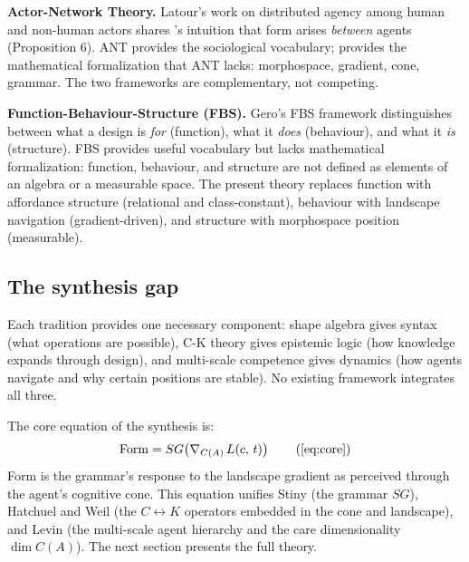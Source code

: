 \textbf{Actor-Network Theory.} Latour's work on distributed agency among human and non-human actors \parencite{Latour2005} shares \formlaere{}'s intuition that form arises \textit{between} agents (Proposition 6). ANT provides the sociological vocabulary; \formlaere{} provides the mathematical formalization that ANT lacks: morphospace, gradient, cone, grammar. The two frameworks are complementary, not competing.

\textbf{Function-Behaviour-Structure (FBS).} Gero's FBS framework \parencite{Gero1990} distinguishes between what a design is \textit{for} (function), what it \textit{does} (behaviour), and what it \textit{is} (structure). FBS provides useful vocabulary but lacks mathematical formalization: function, behaviour, and structure are not defined as elements of an algebra or a measurable space. The present theory replaces function with affordance structure (relational and class-constant), behaviour with landscape navigation (gradient-driven), and structure with morphospace position (measurable).

\subsection{The synthesis gap}

Each tradition provides one necessary component: shape algebra gives syntax (what operations are possible), C-K theory gives epistemic logic (how knowledge expands through design), and multi-scale competence gives dynamics (how agents navigate and why certain positions are stable). No existing framework integrates all three.

The core equation of the synthesis is:
\begin{equation}
\mathrm{Form} = SG\!\left(\nabla_{C(A)}\, L(c,\, t)\right)
\tag{\ref{eq:core}}
\end{equation}
\noindent Form is the grammar's response to the landscape gradient as perceived through the agent's cognitive cone. This equation unifies Stiny (the grammar $SG$), Hatchuel and Weil (the $C \leftrightarrow K$ operators embedded in the cone and landscape), and Levin (the multi-scale agent hierarchy and the care dimensionality $\dim C(A)$). The next section presents the full theory.
